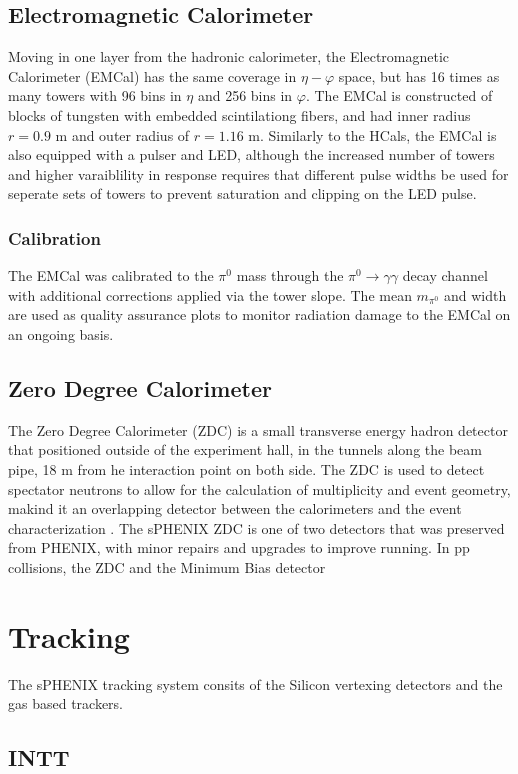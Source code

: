 \documentclass[letterpaper, 12pt, oneside]{book}
\theoremstyle{definition}
\begin{document}
	\subsection{Electromagnetic Calorimeter}
		Moving in one layer from the hadronic calorimeter, the Electromagnetic Calorimeter (EMCal) has the same coverage in $\eta-\varphi$ space,
		but has 16 times as many towers with 96 bins in $\eta$ and 256 bins in $\varphi$. 
		The EMCal is constructed of blocks of tungsten with embedded scintilationg fibers, 
		and had inner radius $r=0.9$ m and outer radius of $r=1.16$ m.
		Similarly to the HCals, the EMCal is also equipped with a pulser and LED, although the increased number of towers and higher varaiblility 
		in response requires that different pulse widths be used for seperate sets of towers to prevent saturation and clipping on the LED pulse.
		\subsubsection{Calibration}
			The EMCal was calibrated to the $\pi^0$ mass through the $\pi^0 \rightarrow \gamma \gamma$ decay channel with additional corrections
			applied via the tower slope. 
			The mean $m_{\pi^0}$ and width are used as quality assurance plots to monitor radiation damage to the EMCal on an ongoing basis.
	\subsection{Zero Degree Calorimeter}
		The Zero Degree Calorimeter (ZDC) is a small transverse energy hadron detector that positioned outside of the experiment hall, in the tunnels along the beam pipe, 18 m from he interaction point on both side.
		The ZDC is used to detect spectator neutrons to allow for the calculation of multiplicity and event geometry, makind it an overlapping detector between the calorimeters and the event characterization \cite{sphenix_ZDC}.
		The sPHENIX ZDC is one of two detectors that was preserved from PHENIX, with minor repairs and upgrades to improve running.
		In pp collisions, the ZDC and the Minimum Bias detector

\section{Tracking}
	The sPHENIX tracking system consits of the Silicon vertexing detectors and the gas based trackers.
	\subsection{INTT}
\end{document}
